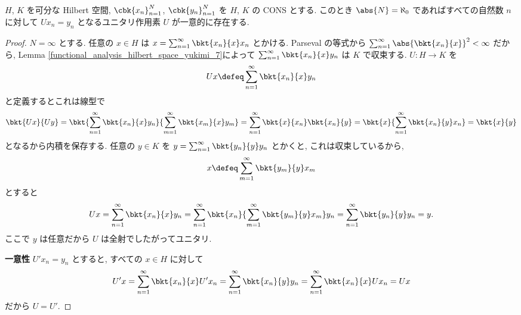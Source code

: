\documentclass[openany, a4paper, oneside]{jsbook}
\begin{document}
\begin{thm}\label{functional_analysis_hilbert_space_yukimi_12}
 $H$, $K$ を可分な Hilbert 空間, $\cbk{x_n}_{n=1}^N$, $\cbk{y_n}_{n=1}^N$ を $H$, $K$ の CONS とする.
 このとき $\abs{N} = \aleph_0$ であればすべての自然数 $n$ に対して $Ux_n = y_n$ となるユニタリ作用素 $U$ が一意的に存在する.
\end{thm}
\begin{proof}
$N = \infty$ とする.
任意の $x \in H$ は $x = \sum_{n=1}^\infty \bkt{x_n}{x} x_n$ とかける.
Parseval の等式から $\sum_{n=1}^\infty \abs{\bkt{x_n}{x}}^2 < \infty$ だから,
Lemma \ref{functional_analysis_hilbert_space_yukimi_7}によって $\sum_{n=1}^\infty \bkt{x_n}{x} y_n$ は $K$ で収束する.
$U \colon H \to K$ を
\begin{align}
 Ux
 \defeq
 \sum_{n=1}^\infty \bkt{x_n}{x} y_n
\end{align}
と定義するとこれは線型で
\begin{align}
 \bkt{Ux}{Uy}
 =
 \bkt{\sum_{n=1}^{\infty} \bkt{x_n}{x} y_n}{\sum_{m=1}^{\infty} \bkt{x_m}{x} y_m}
 =
 \sum_{n=1}^{\infty} \bkt{x}{x_n} \bkt{x_n}{y}
 =
 \bkt{x}{\sum_{n=1}^{\infty} \bkt{x_n}{y} x_n}
 =
 \bkt{x}{y}
\end{align}
となるから内積を保存する.
任意の $y \in K$ を $y = \sum_{n=1}^{\infty} \bkt{y_n}{y} y_n$ とかくと, これは収束しているから,
\begin{align}
 x
 \defeq
 \sum_{m=1}^{\infty} \bkt{y_m}{y} x_m
\end{align}
とすると
\begin{align}
 U x
 =
 \sum_{n=1}^{\infty} \bkt{x_n}{x} y_n
 =
 \sum_{n=1}^{\infty} \bkt{x_n}{\sum_{m=1}^{\infty} \bkt{y_m}{y} x_m} y_n
 =
 \sum_{n=1}^{\infty} \bkt{y_n}{y} y_n
 =
 y.
\end{align}
ここで $y$ は任意だから $U$ は全射でしたがってユニタリ.

\textbf{一意性}
$U'x_n = y_n$ とすると, すべての $x \in H$ に対して
\begin{align}
 U'x
 =
 \sum_{n=1}^{\infty} \bkt{x_n}{x} U' x_n
 =
 \sum_{n=1}^{\infty} \bkt{x_n}{y} y_n
 =
 \sum_{n=1}^{\infty} \bkt{x_n}{x} Ux_n
 =
 Ux
\end{align}
だから $U = U'$.
\end{proof}
\end{document}
